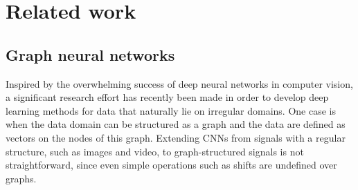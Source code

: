 \documentclass[journal]{IEEEtran}
\begin{document}
\section{Related work} \label{sec:bkg}

\subsection{Graph neural networks}
Inspired by the overwhelming success of deep neural networks in computer vision, a significant research effort has recently been made in order to develop deep learning methods for data that naturally lie on irregular domains. One case is when the data domain can be structured as a graph and the data are defined as vectors on the nodes of this graph. Extending CNNs from signals with a regular structure, such as images and video, to graph-structured signals is not straightforward, since even simple operations such as shifts are undefined over graphs. 
\end{document}
